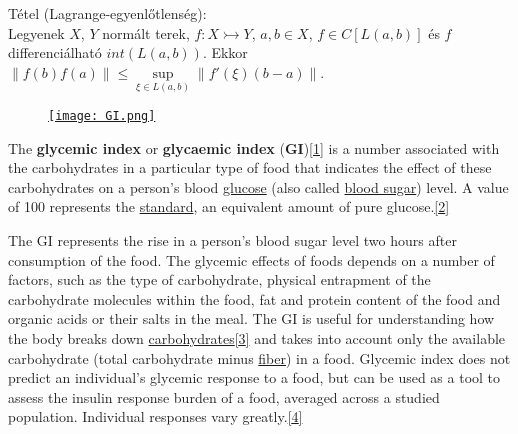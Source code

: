 \documentclass[12pt,a4paper]{scrartcl}
\newenvironment{tetel}{}{}
\newenvironment{ajanlofig}{\begin{figure}\begin{center}}{
\end{center}\end{figure}}
\begin{document}
\begin{tetel}

Tétel (Lagrange-egyenlőtlenség):\\
Legyenek \(X\), \(Y\) normált terek,
\(\left. f:X\rightarrowtail Y \right.\), \(a,b \in X\),
\(f \in C\left\lbrack {L\left( {a,b} \right)} \right\rbrack\) és \(f\)
differenciálható \({int}\left( {L\left( {a,b} \right)} \right)\). Ekkor
\(\left\| {f\left( b \right)f\left( a \right)} \right\| \leq \sup\limits_{\xi \in L{({a,b})}}\left\| {f'\left( \xi \right)\left( {b - a} \right)} \right\|\).

\end{tetel}

\begin{ajanlo}

\begin{ajanlofig}

\href{https://en.wikipedia.org/wiki/Glycemic_index}{\texttt{[image: GI.png]}}

\end{ajanlofig}

The \textbf{glycemic index} or \textbf{glycaemic index}
(\textbf{GI})\href{https://en.wikipedia.org/wiki/Glycemic_index\#cite_note-1}{{[}1{]}}
is a number associated with the carbohydrates in a particular type of
food that indicates the effect of these carbohydrates on a person's
blood \href{https://en.wikipedia.org/wiki/Glucose}{glucose} (also called
\href{https://en.wikipedia.org/wiki/Blood_sugar}{blood sugar}) level. A
value of 100 represents the
\href{https://en.wikipedia.org/wiki/Standard_(metrology)}{standard}, an
equivalent amount of pure
glucose.\href{https://en.wikipedia.org/wiki/Glycemic_index\#cite_note-glycemic1-2}{{[}2{]}}

The GI represents the rise in a person's blood sugar level two hours
after consumption of the food. The glycemic effects of foods depends on
a number of factors, such as the type of carbohydrate, physical
entrapment of the carbohydrate molecules within the food, fat and
protein content of the food and organic acids or their salts in the
meal. The GI is useful for understanding how the body breaks down
\href{https://en.wikipedia.org/wiki/Carbohydrate}{carbohydrates}\href{https://en.wikipedia.org/wiki/Glycemic_index\#cite_note-glycemicedge-3}{{[}3{]}}
and takes into account only the available carbohydrate (total
carbohydrate minus
\href{https://en.wikipedia.org/wiki/Dietary_fiber}{fiber}) in a food.
Glycemic index does not predict an individual's glycemic response to a
food, but can be used as a tool to assess the insulin response burden of
a food, averaged across a studied population. Individual responses vary
greatly.\href{https://en.wikipedia.org/wiki/Glycemic_index\#cite_note-ZeeviKorem2015-4}{{[}4{]}}

\end{ajanlo}
\end{document}
